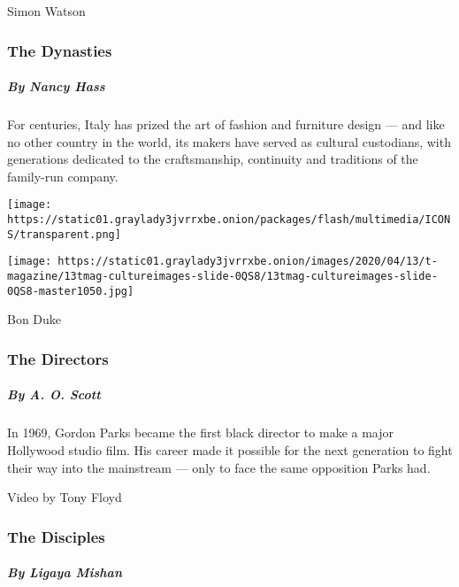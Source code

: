 Simon Watson

\hypertarget{the-dynasties}{%
\subsubsection{The Dynasties}\label{the-dynasties}}

\hypertarget{by-nancy-hass}{%
\subparagraph{By Nancy Hass}\label{by-nancy-hass}}

For centuries, Italy has prized the art of fashion and furniture design
--- and like no other country in the world, its makers have served as
cultural custodians, with generations dedicated to the craftsmanship,
continuity and traditions of the family-run company.

\href{https://www.nytimes3xbfgragh.onion/interactive/2020/04/13/t-magazine/gordon-parks.html}{}

\texttt{[image: https://static01.graylady3jvrrxbe.onion/packages/flash/multimedia/ICONS/transparent.png]}

\texttt{[image: https://static01.graylady3jvrrxbe.onion/images/2020/04/13/t-magazine/13tmag-cultureimages-slide-0QS8/13tmag-cultureimages-slide-0QS8-master1050.jpg]}

Bon Duke

\hypertarget{the-directors}{%
\subsubsection{The Directors}\label{the-directors}}

\hypertarget{by-a-o-scott}{%
\subparagraph{By A. O. Scott}\label{by-a-o-scott}}

In 1969, Gordon Parks became the first black director to make a major
Hollywood studio film. His career made it possible for the next
generation to fight their way into the mainstream --- only to face the
same opposition Parks had.

\href{https://www.nytimes3xbfgragh.onion/interactive/2020/04/13/t-magazine/enrique-olvera-chef.html}{}

Video by Tony Floyd

\hypertarget{the-disciples}{%
\subsubsection{The Disciples}\label{the-disciples}}

\hypertarget{by-ligaya-mishan}{%
\subparagraph{By Ligaya Mishan}\label{by-ligaya-mishan}}

